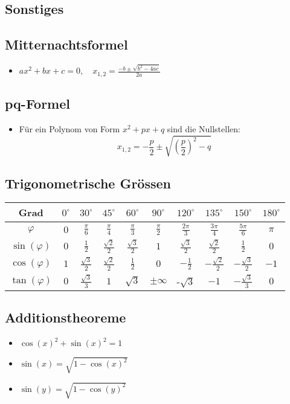 \documentclass[a3paper, 11pt, landscape]{scrartcl}
\begin{document}
\begin{multicols*}{3}
	\section{Sonstiges}
	\subsection{Mitternachtsformel}
	\begin{itemize}
	    \item $ax^2 + bx +c = 0, \quad x_{1,2}=\frac{-b \pm \sqrt{b^2 -4 ac}}{2a}$
	\end{itemize}
	\subsection{pq-Formel}
	\begin{itemize}
	    \item Für ein Polynom von Form \(x^2 + px + q\) sind die Nullstellen:\\
	    \[x_{1,2} = -\frac{p}{2} \pm \sqrt{\left( \frac{p}{2}\right)^2 -q}\]
	\end{itemize}
	
	\subsection{Trigonometrische Grössen}
	\begin{tabular}{|c|c|c|c|c|c|c|c|c|c|}
    	\hline
    	Grad &$0^\circ$ &$30^\circ$ &$45^\circ$ &$60^\circ$ &$90^\circ$ &$120^\circ$ &$135^\circ$ &$150^\circ$ &$180^\circ$\\
    	\hline
    	$\varphi$ &$0$ &$\frac{\pi}{6}$ &$\frac{\pi}{4}$ &$\frac{\pi}{3}$ &$\frac{\pi}{2}$ &$\frac{2\pi}{3}$ &$\frac{3\pi}{4}$ &$\frac{5\pi}{6}$ &$\pi$\\
    	\hline
    	$\sin(\varphi)$ &$0$ &$\frac{1}{2}$ &$\frac{\sqrt{2}}{2}$ &$\frac{\sqrt{3}}{2}$ &$1$ &$\frac{\sqrt{3}}{2}$ &$\frac{\sqrt{2}}{2}$ &$\frac{1}{2}$ &$0$\\
    	\hline
    	$\cos(\varphi)$ &$1$ &$\frac{\sqrt{3}}{2}$ &$\frac{\sqrt{2}}{2}$ &$\frac{1}{2}$ &$0$ &$-\frac{1}{2}$ &$-\frac{\sqrt{2}}{2}$ &$-\frac{\sqrt{3}}{2}$ &$-1$\\
    	\hline
    	$\tan(\varphi)$ &$0$ &$\frac{\sqrt{3}}{3}$ &$1$ &$\sqrt{3}$ &$\pm \infty$ &-$\sqrt{3}$ &$-1$ &$-\frac{\sqrt{3}}{3}$ &$0$\\
    	\hline 
	\end{tabular}
	
	\subsection{Additionstheoreme}
	\begin{itemize}
	    \item $\cos(x)^2+\sin(x)^2=1$
	    \item $\sin (x)=\sqrt{1-\cos (x)^{2}}$
	    \item $\sin (y)=\sqrt{1-\cos (y)^{2}}$
	    

\end{itemize}
\end{multicols*}
\end{document}
